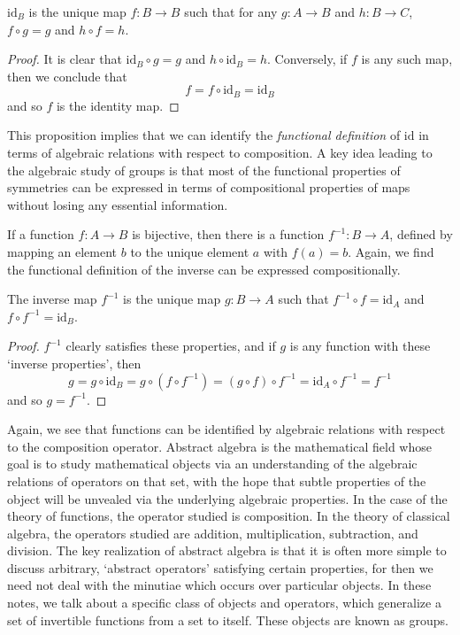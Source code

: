 \begin{theorem}
    $\text{id}_B$ is the unique map $f: B \to B$ such that for any $g: A \to B$ and $h: B \to C$, $f \circ g = g$ and $h \circ f = h$.
\end{theorem}
\begin{proof}
    It is clear that $\text{id}_B \circ g = g$ and $h \circ \text{id}_B = h$. Conversely, if $f$ is any such map, then we conclude that
    \[ f = f \circ \text{id}_B = \text{id}_B \]
    and so $f$ is the identity map.
\end{proof}

This proposition implies that we can identify the {\it functional definition} of $\text{id}$ in terms of algebraic relations with respect to composition. A key idea leading to the algebraic study of groups is that most of the functional properties of symmetries can be expressed in terms of compositional properties of maps without losing any essential information.

If a function $f: A \to B$ is bijective, then there is a function $f^{-1}: B \to A$, defined by mapping an element $b$ to the unique element $a$ with $f(a) = b$. Again, we find the functional definition of the inverse can be expressed compositionally.

\begin{theorem}
    The inverse map $f^{-1}$ is the unique map $g: B \to A$ such that $f^{-1} \circ f = \text{id}_A$ and $f \circ f^{-1} = \text{id}_B$.
\end{theorem}
\begin{proof}
    $f^{-1}$ clearly satisfies these properties, and if $g$ is any function with these `inverse properties', then
    \[ g = g \circ \text{id}_B = g \circ (f \circ f^{-1}) = (g \circ f) \circ f^{-1} = \text{id}_A \circ f^{-1} = f^{-1} \]
    and so $g = f^{-1}$.
\end{proof}

Again, we see that functions can be identified by algebraic relations with respect to the composition operator. Abstract algebra is the mathematical field whose goal is to study mathematical objects via an understanding of the algebraic relations of operators on that set, with the hope that subtle properties of the object will be unvealed via the underlying algebraic properties. In the case of the theory of functions, the operator studied is composition. In the theory of classical algebra, the operators studied are addition, multiplication, subtraction, and division. The key realization of abstract algebra is that it is often more simple to discuss arbitrary, `abstract operators' satisfying certain properties, for then we need not deal with the minutiae which occurs over particular objects. In these notes, we talk about a specific class of objects and operators, which generalize a set of invertible functions from a set to itself. These objects are known as groups.

